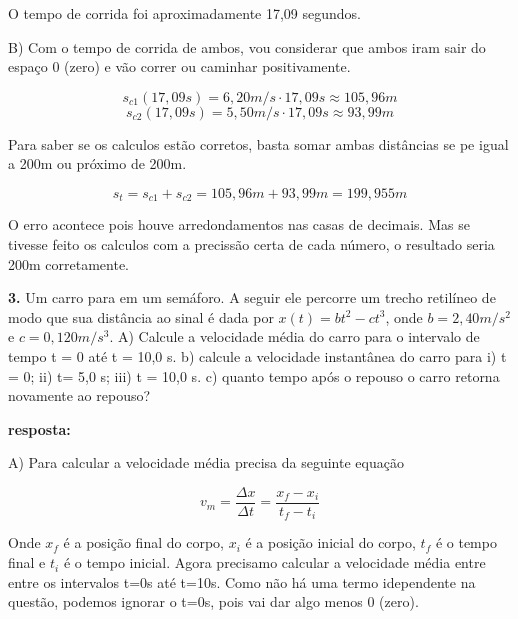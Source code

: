 \documentclass[a4paper, 12pt]{article}
\begin{document}
\begin{flushleft}
		O tempo de corrida foi aproximadamente 17,09 segundos.
		
		B) Com o tempo de corrida de ambos, vou considerar que ambos iram sair do espaço 0 (zero) e vão correr ou caminhar positivamente.
		
		\begin{equation*}
			s_{c1}(17,09s) = 6,20m/s \cdot 17,09s \approx 105,96m
		\end{equation*}
		\begin{equation*}
			s_{c2}(17,09s) = 5,50m/s \cdot 17,09s \approx 93,99m
		\end{equation*}
		
		Para saber se os calculos estão corretos, basta somar ambas distâncias se pe igual a 200m ou próximo de 200m.
		
		\begin{equation*}
			s_{t} = s_{c1} + s_{c2} = 105,96m + 93,99m = 199,955m
		\end{equation*}
		
		O erro acontece pois houve arredondamentos nas casas de decimais. Mas se tivesse feito os calculos com a precissão certa de cada número, o resultado seria 200m corretamente.
		
		
		\vspace{2em}
		
		
		\textbf{3.} Um carro para em um semáforo. A seguir ele percorre um trecho retilíneo de modo que sua distância ao sinal é dada por $x(t) = bt^2 - ct^3$, onde $b = 2,40m/s^2$ e $c = 0,120m/s^3$. A) Calcule a velocidade média do carro para o intervalo de tempo t = 0 até t = 10,0 s. b) calcule a velocidade instantânea do carro para i) t = 0; ii) t= 5,0 s; iii) t = 10,0 s. c) quanto tempo após o repouso o carro retorna novamente ao repouso?
		
		\textbf{resposta:}
		
		A) Para calcular a velocidade média precisa da seguinte equação
		
		\begin{equation*}
			v_m = \frac{\Delta{x}}{\Delta{t}} = \frac{x_f - x_i}{t_f - t_i}
		\end{equation*}
		
		Onde $x_f$ é a posição final do corpo, $x_i$ é a posição inicial do corpo, $t_f$ é o tempo final e $t_i$ é o tempo inicial. Agora precisamo calcular a velocidade média entre entre os intervalos t=0s até t=10s. Como não há uma termo idependente na questão, podemos ignorar o t=0s, pois vai dar algo menos 0 (zero).
		

\end{flushleft}
\end{document}

